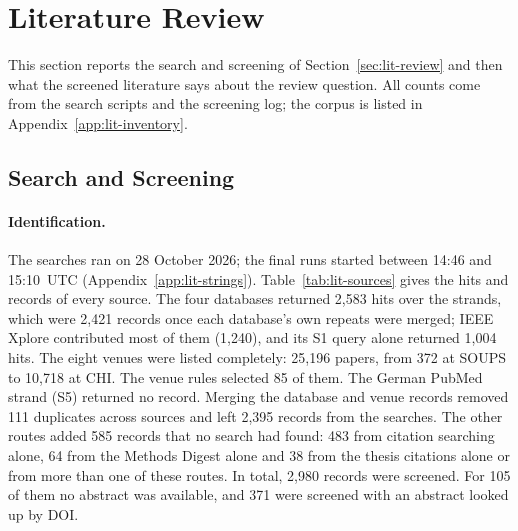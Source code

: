 \section{Literature Review}
\label{sec:results-lit}
This section reports the search and screening of Section~\ref{sec:lit-review}
and then what the screened literature says about the review question. All
counts come from the search scripts and the screening log; the corpus is listed
in Appendix~\ref{app:lit-inventory}.

\subsection{Search and Screening}

\paragraph{Identification.} The searches ran on 28 October 2026; the final runs
started between 14:46 and 15:10~UTC (Appendix~\ref{app:lit-strings}).
Table~\ref{tab:lit-sources} gives the hits and records of every source. The four
databases returned 2{,}583 hits over the strands, which were 2{,}421 records
once each database's own repeats were merged; IEEE Xplore contributed most of
them (1{,}240), and its S1 query alone returned 1{,}004 hits. The eight venues
were listed completely: 25{,}196 papers, from 372 at SOUPS to 10{,}718 at CHI.
The venue rules selected 85 of them. The German PubMed strand (S5) returned no
record. Merging the database and venue records removed 111 duplicates across
sources and left 2{,}395 records from the searches. The other routes added 585
records that no search had found: 483 from citation searching alone, 64 from the
Methods Digest alone and 38 from the thesis citations alone or from more than
one of these routes.
In total, 2{,}980 records were screened. For 105 of them no abstract was
available, and 371 were screened with an abstract looked up by DOI.

